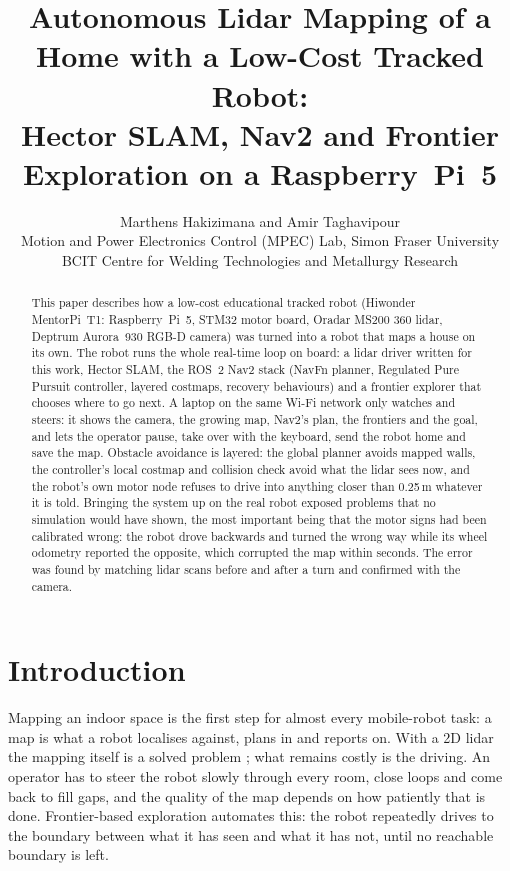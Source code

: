 \documentclass[10pt,twocolumn]{article}
\title{\textbf{Autonomous Lidar Mapping of a Home with a Low-Cost Tracked Robot:\\
Hector SLAM, Nav2 and Frontier Exploration on a Raspberry~Pi~5}}
\author{Marthens Hakizimana and Amir Taghavipour\\
\small Motion and Power Electronics Control (MPEC) Lab, Simon Fraser University\\
\small BCIT Centre for Welding Technologies and Metallurgy Research}
\date{\small \todaydate}
\begin{document}
\maketitle

\begin{abstract}
\noindent
This paper describes how a low-cost educational tracked robot (Hiwonder MentorPi~T1:
Raspberry~Pi~5, STM32 motor board, Oradar MS200 360\textdegree{} lidar, Deptrum Aurora~930
RGB-D camera) was turned into a robot that maps a house on its own. The robot runs the whole
real-time loop on board: a lidar driver written for this work, Hector SLAM, the ROS~2 Nav2
stack (NavFn planner, Regulated Pure Pursuit controller, layered costmaps, recovery behaviours)
and a frontier explorer that chooses where to go next. A laptop on the same Wi-Fi network only
watches and steers: it shows the camera, the growing map, Nav2's plan, the frontiers and the
goal, and lets the operator pause, take over with the keyboard, send the robot home and save
the map. Obstacle avoidance is layered: the global planner avoids mapped walls, the controller's
local costmap and collision check avoid what the lidar sees now, and the robot's own motor node
refuses to drive into anything closer than 0.25\,m whatever it is told. Bringing the system up
on the real robot exposed problems that no simulation would have shown, the most important being
that the motor signs had been calibrated wrong: the robot drove backwards and turned the wrong way
while its wheel odometry reported the opposite, which corrupted the map within seconds. The
error was found by matching lidar scans before and after a turn and confirmed with the camera.
\resultsabstract
\end{abstract}

\section{Introduction}
Mapping an indoor space is the first step for almost every mobile-robot task: a map is what a
robot localises against, plans in and reports on. With a 2D lidar the mapping itself is a solved
problem \cite{kohlbrecher2011,grisetti2007,hess2016}; what remains costly is the driving. An
operator has to steer the robot slowly through every room, close loops and come back to fill
gaps, and the quality of the map depends on how patiently that is done. Frontier-based
exploration \cite{yamauchi1997} automates this: the robot repeatedly drives to the boundary
between what it has seen and what it has not, until no reachable boundary is left.
\end{document}
